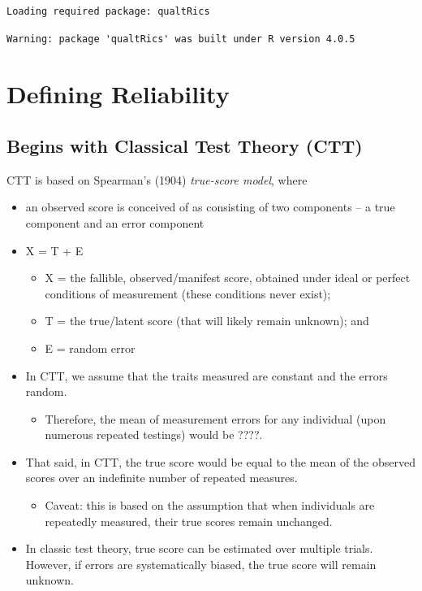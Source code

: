 \documentclass[
  english,
]{book}
\providecommand{\tightlist}{%
  \setlength{\itemsep}{0pt}\setlength{\parskip}{0pt}}
\begin{document}
\begin{verbatim}
Loading required package: qualtRics
\end{verbatim}

\begin{verbatim}
Warning: package 'qualtRics' was built under R version 4.0.5
\end{verbatim}

\hypertarget{defining-reliability}{%
\section{Defining Reliability}\label{defining-reliability}}

\hypertarget{begins-with-classical-test-theory-ctt}{%
\subsection{Begins with Classical Test Theory (CTT)}\label{begins-with-classical-test-theory-ctt}}

CTT is based on Spearman's (1904) \emph{true-score model}, where

\begin{itemize}
\tightlist
\item
  an observed score is conceived of as consisting of two components -- a true component and an error component
\item
  X = T + E

  \begin{itemize}
  \tightlist
  \item
    X = the fallible, observed/manifest score, obtained under ideal or perfect conditions of measurement (these conditions never exist);
  \item
    T = the true/latent score (that will likely remain unknown); and
  \item
    E = random error
  \end{itemize}
\item
  In CTT, we assume that the traits measured are constant and the errors random.

  \begin{itemize}
  \tightlist
  \item
    Therefore, the mean of measurement errors for any individual (upon numerous repeated testings) would be ????.
  \end{itemize}
\item
  That said, in CTT, the true score would be equal to the mean of the observed scores over an indefinite number of repeated measures.

  \begin{itemize}
  \tightlist
  \item
    Caveat: this is based on the assumption that when individuals are repeatedly measured, their true scores remain unchanged.
  \end{itemize}
\item
  In classic test theory, true score can be estimated over multiple trials. However, if errors are systematically biased, the true score will remain unknown.
\end{itemize}
\end{document}
